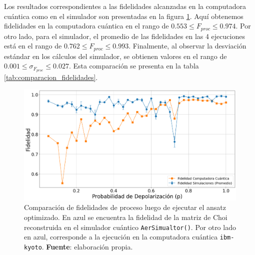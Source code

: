 \documentclass[letterpaper,12pt]{thesisECFM}
\theoremstyle{plain}
\theoremstyle{definition}
\theoremstyle{definition}
\theoremstyle{remark}
\newcommand{\1}{\mathbb{1}}
\begin{document}
Los resultados correspondientes a las fidelidades alcanzadas en la computadora
cuántica como en el simulador son presentadas en la figura
\ref{fig:comparacion_fidelidad}. Aquí obtenemos fidelidades en la computadora
cuántica en el rango de $0.553\leq F_{proc} \leq 0.974$. Por otro lado, para el
simulador, el promedio de las fidelidades en las 4 ejecuciones está en el rango
de $0.762\leq F_{proc} \leq 0.993$. Finalmente, al observar la desviación
estándar en los cálculos del simulador, se obtienen valores en el rango de
$0.001\leq \sigma_{F_{proc}} \leq 0.027$. Esta comparación se presenta en la
tabla \ref{tab:comparacion_fidelidades}.



\begin{figure}[h!] 
    \centering 
    \includegraphics[width=0.7\linewidth]{imagenes/comparacion fidelidad.png}
    \caption{Comparación de fidelidades de proceso luego de ejecutar el ansatz
optimizado. En azul se encuentra la fidelidad de la matriz de Choi reconstruida
en el simulador cuántico \texttt{AerSimualtor()}. Por otro lado en azul,
corresponde a la ejecución en la computadora cuántica \texttt{ibm-kyoto}.
\textbf{Fuente}: elaboración propia. }
    \label{fig:comparacion_fidelidad}
    \end{figure}
    

\begin{table}[htbp]
\centering 
{}
\caption{Comparación de fidelidad de proceso entre las matrices de Choi
reconstruidas del ansatz optimizado. Los resultados de la computadora cuántica
fueron tomados en \texttt{ibm-kyoto}, mientras que en el simulador fueron en
\texttt{AerSimualtor()} de Qiskit. \textbf{Fuente:} elaboración propia.}
\label{tab:comparacion_fidelidades}
\end{table}
\end{document}
